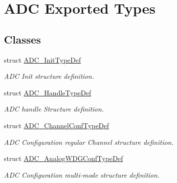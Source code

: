\hypertarget{group___a_d_c___exported___types}{}\section{A\+DC Exported Types}
\label{group___a_d_c___exported___types}
\subsection*{Classes}
\begin{DoxyCompactItemize}
\item 
struct \hyperlink{struct_a_d_c___init_type_def}{A\+D\+C\+\_\+\+Init\+Type\+Def}
\begin{DoxyCompactList}\small\item\em A\+DC Init structure definition. \end{DoxyCompactList}\item 
struct \hyperlink{struct_a_d_c___handle_type_def}{A\+D\+C\+\_\+\+Handle\+Type\+Def}
\begin{DoxyCompactList}\small\item\em A\+DC handle Structure definition. \end{DoxyCompactList}\item 
struct \hyperlink{struct_a_d_c___channel_conf_type_def}{A\+D\+C\+\_\+\+Channel\+Conf\+Type\+Def}
\begin{DoxyCompactList}\small\item\em A\+DC Configuration regular Channel structure definition. \end{DoxyCompactList}\item 
struct \hyperlink{struct_a_d_c___analog_w_d_g_conf_type_def}{A\+D\+C\+\_\+\+Analog\+W\+D\+G\+Conf\+Type\+Def}
\begin{DoxyCompactList}\small\item\em A\+DC Configuration multi-\/mode structure definition. \end{DoxyCompactList}\end{DoxyCompactItemize}
